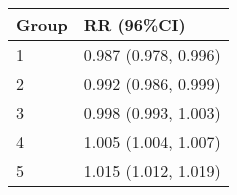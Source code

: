 \begin{tabular}{ll}
  \hline
Group & RR (96\%CI) \\ 
  \hline
   1 & 0.987 (0.978, 0.996) \\ 
     2 & 0.992 (0.986, 0.999) \\ 
     3 & 0.998 (0.993, 1.003) \\ 
     4 & 1.005 (1.004, 1.007) \\ 
     5 & 1.015 (1.012, 1.019) \\ 
   \hline
\end{tabular}

